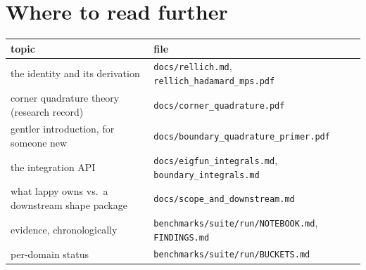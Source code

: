 \documentclass[11pt]{article}
\newcommand{\code}[1]{\texttt{#1}}
\begin{document}
\section{Where to read further}

\begin{center}\small
\begin{tabularx}{\textwidth}{@{}L l@{}}
\toprule
\textbf{topic} & \textbf{file} \\
\midrule
the identity and its derivation & \code{docs/rellich.md}, \code{rellich\_hadamard\_mps.pdf} \\
corner quadrature theory (research record) & \code{docs/corner\_quadrature.pdf} \\
gentler introduction, for someone new & \code{docs/boundary\_quadrature\_primer.pdf} \\
the integration API & \code{docs/eigfun\_integrals.md}, \code{boundary\_integrals.md} \\
what lappy owns vs.\ a downstream shape package & \code{docs/scope\_and\_downstream.md} \\
evidence, chronologically & \code{benchmarks/suite/run/NOTEBOOK.md}, \code{FINDINGS.md} \\
per-domain status & \code{benchmarks/suite/run/BUCKETS.md} \\
\bottomrule
\end{tabularx}
\end{center}
\end{document}
